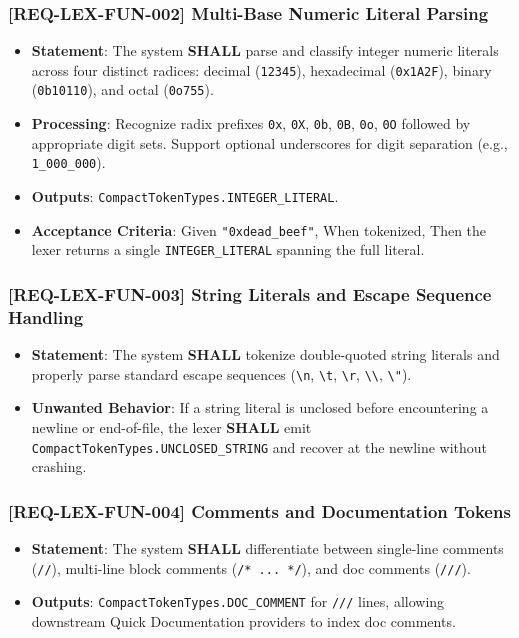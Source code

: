 \subsubsection{[REQ-LEX-FUN-002] Multi-Base Numeric Literal Parsing}
\begin{itemize}
    \item \textbf{Statement}: The system \textbf{SHALL} parse and classify integer numeric literals across four distinct radices: decimal (\texttt{12345}), hexadecimal (\texttt{0x1A2F}), binary (\texttt{0b10110}), and octal (\texttt{0o755}).
    \item \textbf{Processing}: Recognize radix prefixes \texttt{0x}, \texttt{0X}, \texttt{0b}, \texttt{0B}, \texttt{0o}, \texttt{0O} followed by appropriate digit sets. Support optional underscores for digit separation (e.g., \texttt{1\_000\_000}).
    \item \textbf{Outputs}: \texttt{CompactTokenTypes.INTEGER\_LITERAL}.
    \item \textbf{Acceptance Criteria}: Given \texttt{"0xdead\_beef"}, When tokenized, Then the lexer returns a single \texttt{INTEGER\_LITERAL} spanning the full literal.
\end{itemize}

\subsubsection{[REQ-LEX-FUN-003] String Literals and Escape Sequence Handling}
\begin{itemize}
    \item \textbf{Statement}: The system \textbf{SHALL} tokenize double-quoted string literals and properly parse standard escape sequences (\texttt{\textbackslash n}, \texttt{\textbackslash t}, \texttt{\textbackslash r}, \texttt{\textbackslash \textbackslash}, \texttt{\textbackslash "}).
    \item \textbf{Unwanted Behavior}: If a string literal is unclosed before encountering a newline or end-of-file, the lexer \textbf{SHALL} emit \texttt{CompactTokenTypes.UNCLOSED\_STRING} and recover at the newline without crashing.
\end{itemize}

\subsubsection{[REQ-LEX-FUN-004] Comments and Documentation Tokens}
\begin{itemize}
    \item \textbf{Statement}: The system \textbf{SHALL} differentiate between single-line comments (\texttt{//}), multi-line block comments (\texttt{/* ... */}), and doc comments (\texttt{///}).
    \item \textbf{Outputs}: \texttt{CompactTokenTypes.DOC\_COMMENT} for \texttt{///} lines, allowing downstream Quick Documentation providers to index doc comments.
\end{itemize}

